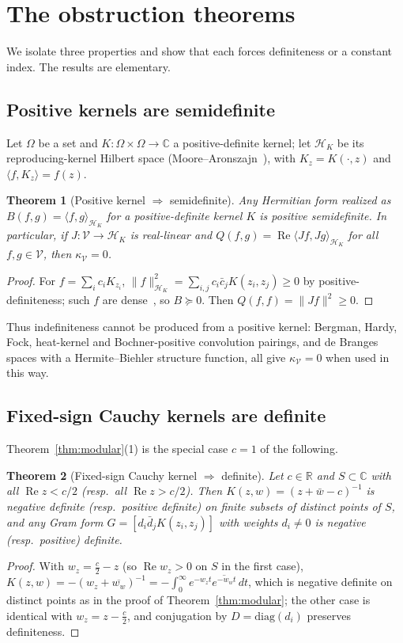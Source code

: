 \documentclass[11pt]{amsart}
\newtheorem{theorem}{Theorem}[section]
\theoremstyle{definition}
\theoremstyle{remark}
\renewcommand{\Re}{\operatorname{Re}}
\newcommand{\HK}{\mathcal H_K}
\newcommand{\kV}{\kappa_{\mathcal V}}
\begin{document}
\section{The obstruction theorems}\label{sec:obstruction}

We isolate three properties and show that each forces definiteness or a constant index. The
results are elementary.

\subsection{Positive kernels are semidefinite}
Let $\Omega$ be a set and $K:\Omega\times\Omega\to\mathbb C$ a positive-definite kernel; let
$\HK$ be its reproducing-kernel Hilbert space (Moore--Aronszajn~\cite{Aronszajn}), with
$K_z=K(\cdot,z)$ and $\langle f,K_z\rangle=f(z)$.

\begin{theorem}[Positive kernel $\Rightarrow$ semidefinite]\label{thm:A}
Any Hermitian form realized as $B(f,g)=\langle f,g\rangle_{\HK}$ for a positive-definite kernel
$K$ is positive semidefinite. In particular, if $J:\mathcal V\to\HK$ is real-linear and
$Q(f,g)=\Re\langle Jf,Jg\rangle_{\HK}$ for all $f,g\in\mathcal V$, then $\kV=0$.
\end{theorem}
\begin{proof}
For $f=\sum_i c_iK_{z_i}$, $\|f\|_{\HK}^2=\sum_{i,j}c_i\bar c_j K(z_i,z_j)\ge0$ by
positive-definiteness; such $f$ are dense~\cite{Aronszajn}, so $B\succeq0$. Then
$Q(f,f)=\|Jf\|^2\ge0$.
\end{proof}

Thus indefiniteness cannot be produced from a positive kernel: Bergman, Hardy, Fock, heat-kernel
and Bochner-positive convolution pairings, and de Branges spaces with a Hermite--Biehler structure
function, all give $\kV=0$ when used in this way.

\subsection{Fixed-sign Cauchy kernels are definite}
Theorem~\ref{thm:modular}(1) is the special case $c=1$ of the following.

\begin{theorem}[Fixed-sign Cauchy kernel $\Rightarrow$ definite]\label{thm:B}
Let $c\in\mathbb R$ and $S\subset\mathbb C$ with all $\Re z<c/2$ (resp.\ all $\Re z>c/2$).
Then $K(z,w)=(z+\bar w-c)^{-1}$ is negative definite (resp.\ positive definite) on finite subsets
of distinct points of $S$, and any Gram form $G=[d_i\bar d_j K(z_i,z_j)]$ with weights $d_i\ne0$
is negative (resp.\ positive) definite.
\end{theorem}
\begin{proof}
With $w_z=\tfrac c2-z$ (so $\Re w_z>0$ on $S$ in the first case),
$K(z,w)=-(w_z+\overline{w_w})^{-1}=-\int_0^\infty e^{-w_zt}\overline{e^{-w_wt}}\,dt$, which is
negative definite on distinct points as in the proof of Theorem~\ref{thm:modular}; the other case
is identical with $w_z=z-\tfrac c2$, and conjugation by $D=\mathrm{diag}(d_i)$ preserves
definiteness.
\end{proof}
\end{document}
